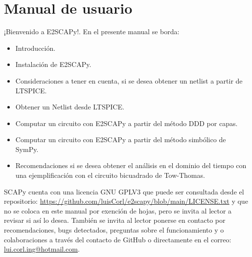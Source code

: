 \renewcommand{\thepage}{\roman{page}}
\chapter*{Manual de usuario}
¡Bienvenido a E2SCAPy!. En el presente manual se borda:
\begin{itemize}
	\item Introducción.
	\item Instalación de E2SCAPy.
	\item Consideraciones a tener en cuenta, si se desea obtener un netlist a partir de LTSPICE.
	\item Obtener un Netlist desde LTSPICE.
	\item Computar un circuito con E2SCAPy a partir del método DDD por capas.
	\item Computar un circuito con E2SCAPy a partir del método simbólico de SymPy. 
	\item Recomendaciones si se desea obtener el análisis en el dominio del tiempo con una ejemplificación con el circuito bicuadrado de Tow-Thomas.
\end{itemize}
SCAPy cuenta con una licencia GNU GPLV3 que puede ser consultada desde el repositorio: \url{https://github.com/luisCorl/e2scapy/blob/main/LICENSE.txt} y que no se coloca en este manual por exención de hojas, pero se invita al lector a revisar si así lo desea. También se invita al lector ponerse en contacto por recomendaciones, bugs detectados, preguntas sobre el funcionamiento y o colaboraciones a través del  contacto de GitHub o directamente en el correo: \url{lui.corl.ing@hotmail.com}.
